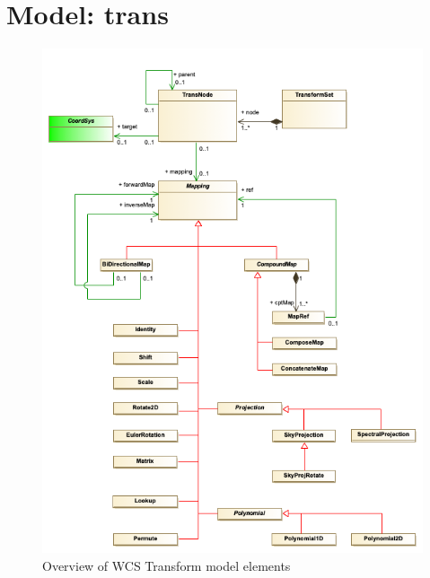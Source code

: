 %



    
    
    
    
    
    
    
    
    
      

\pagebreak
\section{Model: trans }
  
  \begin{figure}[h]
  \begin{center}
    \includegraphics[width=5.25in]{diagrams/overview.png}
    \caption{Overview of WCS Transform model elements}\label{fig:overview}
  \end{center}
  \end{figure}

